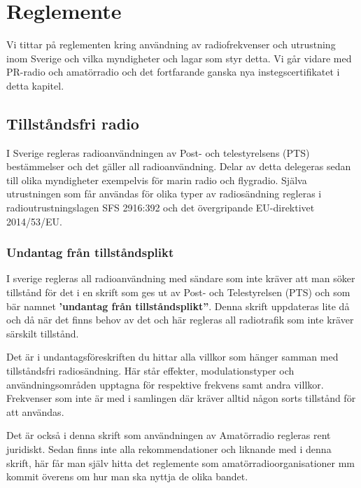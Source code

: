 \chapter{Reglemente}

Vi tittar på reglementen kring användning av radiofrekvenser och utrustning
inom Sverige och vilka myndigheter och lagar som styr detta. Vi går vidare med
PR-radio och amatörradio och det fortfarande ganska nya instegscertifikatet i
detta kapitel.

\clearpage

\section{Tillståndsfri radio}

I Sverige regleras radioanvändningen av Post- och telestyrelsens (PTS)
bestämmelser och det gäller all radioanvändning. Delar av detta delegeras
sedan till olika myndigheter exempelvis för marin radio och flygradio. Själva
utrustningen som får användas för olika typer av radiosändning regleras i
radioutrustningslagen SFS 2916:392 och det övergripande EU-direktivet
2014/53/EU.

\subsection{Undantag från tillståndsplikt}

I sverige regleras all radioanvändning med sändare som inte kräver att man
söker tillstånd för det i en skrift som ges ut av Post- och Telestyrelsen
(PTS) och som bär namnet {\bf 'undantag från tillståndsplikt''}. Denna skrift
uppdateras lite då och då när det finns behov av det och här regleras all
radiotrafik som inte kräver särskilt tillstånd.

Det är i undantagsföreskriften du hittar alla villkor som hänger samman med
tillståndsfri radio\-sänd\-ning. Här står effekter, modulationstyper och
användningsområden upptagna för respektive frekvens samt andra
villkor. Frekvenser som inte är med i samlingen där kräver alltid någon sorts
tillstånd för att användas.

Det är också i denna skrift som användningen av Amatörradio regleras rent
juridiskt. Sedan finns inte alla rekommendationer och liknande med i denna
skrift, här får man själv hitta det reglemente som amatörradioorganisationer
mm kommit överens om hur man ska nyttja de olika bandet.

